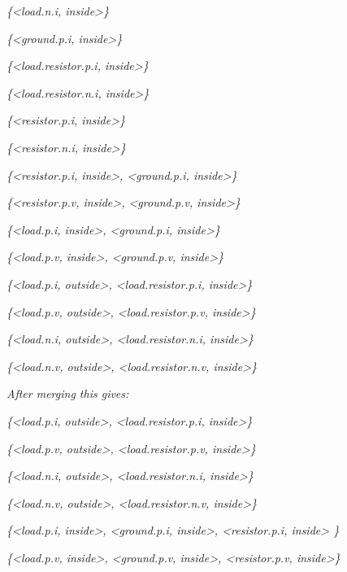 \emph{\{\textless{}load.n.i, inside\textgreater{}\}}

\emph{\{\textless{}ground.p.i, inside\textgreater{}\}}

\emph{\{\textless{}load.resistor.p.i, inside\textgreater{}\}}

\emph{\{\textless{}load.resistor.n.i, inside\textgreater{}\}}

\emph{\{\textless{}resistor.p.i, inside\textgreater{}\}}

\emph{\{\textless{}resistor.n.i, inside\textgreater{}\}}

\emph{\{\textless{}resistor.p.i, inside\textgreater{},
\textless{}ground.p.i, inside\textgreater{}\}}

\emph{\{\textless{}resistor.p.v, inside\textgreater{},
\textless{}ground.p.v, inside\textgreater{}\}}

\emph{\{\textless{}load.p.i, inside\textgreater{},
\textless{}ground.p.i, inside\textgreater{}\}}

\emph{\{\textless{}load.p.v, inside\textgreater{},
\textless{}ground.p.v, inside\textgreater{}\}}

\emph{\{\textless{}load.p.i, outside\textgreater{},
\textless{}load.resistor.p.i, inside\textgreater{}\}}

\emph{\{\textless{}load.p.v, outside\textgreater{},
\textless{}load.resistor.p.v, inside\textgreater{}\}}

\emph{\{\textless{}load.n.i, outside\textgreater{},
\textless{}load.resistor.n.i, inside\textgreater{}\}}

\emph{\{\textless{}load.n.v, outside\textgreater{},
\textless{}load.resistor.n.v, inside\textgreater{}\}}

\emph{After merging this gives:}

\emph{\{\textless{}load.p.i, outside\textgreater{},
\textless{}load.resistor.p.i, inside\textgreater{}\}}

\emph{\{\textless{}load.p.v, outside\textgreater{},
\textless{}load.resistor.p.v, inside\textgreater{}\}}

\emph{\{\textless{}load.n.i, outside\textgreater{},
\textless{}load.resistor.n.i, inside\textgreater{}\}}

\emph{\{\textless{}load.n.v, outside\textgreater{},
\textless{}load.resistor.n.v, inside\textgreater{}\}}

\emph{\{\textless{}load.p.i, inside\textgreater{},
\textless{}ground.p.i, inside\textgreater{}, \textless{}resistor.p.i,
inside\textgreater{} \}}

\emph{\{\textless{}load.p.v, inside\textgreater{},
\textless{}ground.p.v, inside\textgreater{}, \textless{}resistor.p.v,
inside\textgreater{}\}}

